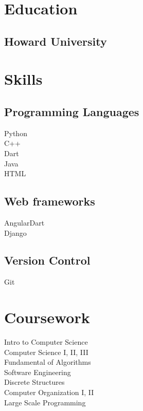 \documentclass[]{deedy-resume-reversed}
\begin{document}
\begin{minipage}[t]{0.33\textwidth}


\section{Education}

\subsection{Howard University}
\sectionsep


\section{Skills}
\subsection{Programming Languages}
Python \\
C++ \\
Dart \\
Java \\
HTML \\
\sectionsep

\subsection{Web frameworks}
AngularDart \\
Django \\
\sectionsep

\subsection{Version Control}
Git \\
\sectionsep


\section{Coursework}
Intro to Computer Science \\
Computer Science I, II, III \\
Fundamental of Algorithms \\
Software Engineering \\
Discrete Structures \\
Computer Organization I, II\\
Large Scale Programming \\


\end{minipage}
\end{document}

